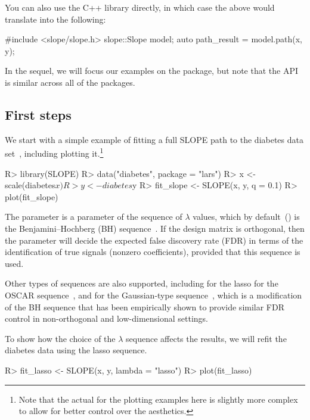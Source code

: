 \documentclass[article]{jss}
\begin{document}
\medskip

You can also use the C++ library directly, in
which case the above would translate into the
following:
\begin{Code}
#include <slope/slope.h>
slope::Slope model;
auto path_result = model.path(x, y);
\end{Code}

In the sequel, we will focus our examples on the  package, but
note that the API is similar across all of the packages.

\subsection{First steps}

We start with a simple example of fitting a full SLOPE path to the diabetes
data set~\citep{efron2004}, including plotting it.\footnote{Note that
  the actual for the plotting examples here is slightly more complex
  to allow for better control over the aesthetics.}

\begin{Code}
R> library(SLOPE)
R> data("diabetes", package = "lars")
R> x <- scale(diabetes$x)
R> y <- diabetes$y
R> fit_slope <- SLOPE(x, y, q = 0.1)
R> plot(fit_slope)
\end{Code}

The  parameter is a parameter of the sequence of \(\lambda\) values,
which by default~() is the Benjamini--Hochberg (BH)
sequence~\citep{bogdan2015}. If the design matrix is orthogonal, then the
 parameter will decide the expected false discovery rate (FDR) in terms
of the identification of true signals (nonzero coefficients), provided
that this sequence is used.

Other types of sequences are also supported,
including  for the lasso
 for the OSCAR sequence~\citep{bondell2008}, and
 for the Gaussian-type sequence~\citep{bogdan2015},
which is a modification of the BH sequence that has been empirically shown to
provide similar FDR control in non-orthogonal and low-dimensional settings.

To show how the choice of the \(\lambda\) sequence affects the
results, we will refit the diabetes data using the lasso sequence.

\begin{Code}
R> fit_lasso <- SLOPE(x, y, lambda = "lasso")
R> plot(fit_lasso)
\end{Code}
\end{document}
